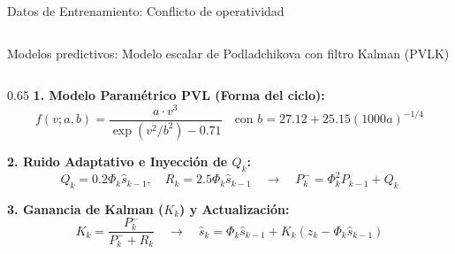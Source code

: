 \documentclass[aspectratio=169]{beamer}
\begin{document}
\begin{frame}{Datos de Entrenamiento: Conflicto de operatividad}
\begin{columns}[c]
    \end{columns}

    \vfill %

    
\end{frame}

\begin{frame}{Modelos predictivos: Modelo escalar de Podladchikova con filtro Kalman (PVLK)}
    \centering
    \small
    
    \vspace{0.1cm}
    \begin{columns}[T]
        \begin{column}{0.65\textwidth}
            \footnotesize
            \textbf{1. Modelo Paramétrico PVL (Forma del ciclo):}
            \begin{equation*}
                f(v; a, b) = \frac{a \cdot v^3}{\exp(v^2/b^2) - 0.71} \quad \text{con } b=27.12 + 25.15(1000a)^{-1/4}
            \end{equation*}

            \textbf{2. Ruido Adaptativo e Inyección de $Q_k$:}
            \begin{equation*}
                Q_k = 0.2 \Phi_k \hat{s}_{k-1}, \quad R_k = 2.5 \Phi_k \hat{s}_{k-1} \quad \rightarrow \quad P_k^- = \Phi_k^2 P_{k-1} + Q_k
            \end{equation*}

            \textbf{3. Ganancia de Kalman ($K_k$) y Actualización:}
            \begin{equation*}
                K_k = \frac{P_k^-}{P_k^- + R_k} \quad \rightarrow \quad \hat{s}_k = \Phi_k \hat{s}_{k-1} + K_k (z_k - \Phi_k \hat{s}_{k-1})
            \end{equation*}
        \end{column}
        

\end{columns}
\end{frame}
\end{document}

